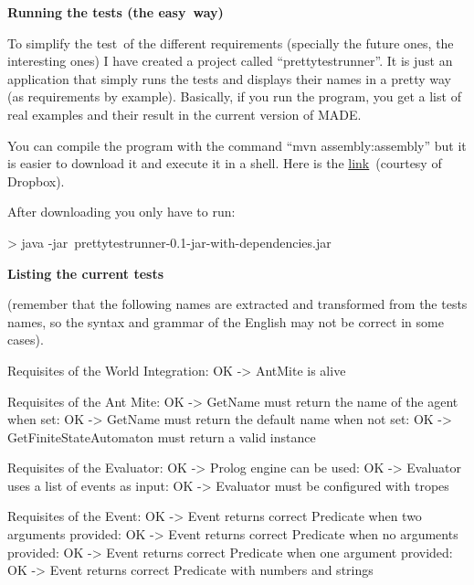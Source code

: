 \documentclass[a4paper]{article}
\newcommand\textstyleStrongEmphasis[1]{\textbf{#1}}
\begin{document}
\textstyleStrongEmphasis{Running the tests (the easy~way)}

To simplify the test~of the different requirements (specially the future
ones, the interesting ones) I have created a project called
{\textquotedblleft}prettytestrunner{\textquotedblright}. It is just an
application that simply runs the tests and displays their names in a
pretty way (as requirements by example). Basically, if you run the
program, you get a list of real examples and their result in the
current version of MADE.

You can compile the program with the command {\textquotedblleft}mvn
assembly:assembly{\textquotedblright} but it is easier to download it
and execute it in a shell. Here is the
\href{https://www.dropbox.com/s/g95az0lv2tqn7b1/prettytestrunner-0.1-jar-with-dependencies.jar?dl=0}{link}~(courtesy
of Dropbox).

After downloading you only have to run:

{\textgreater} java -jar~prettytestrunner-0.1-jar-with-dependencies.jar

\textstyleStrongEmphasis{Listing the current tests}

(remember that the following names are extracted and transformed from
the tests names, so the syntax and grammar of the English may not be
correct in some cases).

Requisites of the World Integration: OK -{\textgreater} AntMite is alive

Requisites of the Ant Mite: OK -{\textgreater} GetName must return the name of the agent when
set: OK -{\textgreater} GetName must return the default name when not
set: OK -{\textgreater} GetFiniteStateAutomaton must return a valid
instance

Requisites of the Evaluator: OK -{\textgreater} Prolog engine can be used: OK -{\textgreater} Evaluator uses a list of events as input: OK -{\textgreater} Evaluator must be configured with tropes

Requisites of the Event: OK -{\textgreater} Event returns correct Predicate when two arguments
provided: OK -{\textgreater} Event returns correct Predicate when no arguments
provided: OK -{\textgreater} Event returns correct Predicate when one argument
provided: OK -{\textgreater} Event returns correct Predicate with numbers and
strings
\end{document}
